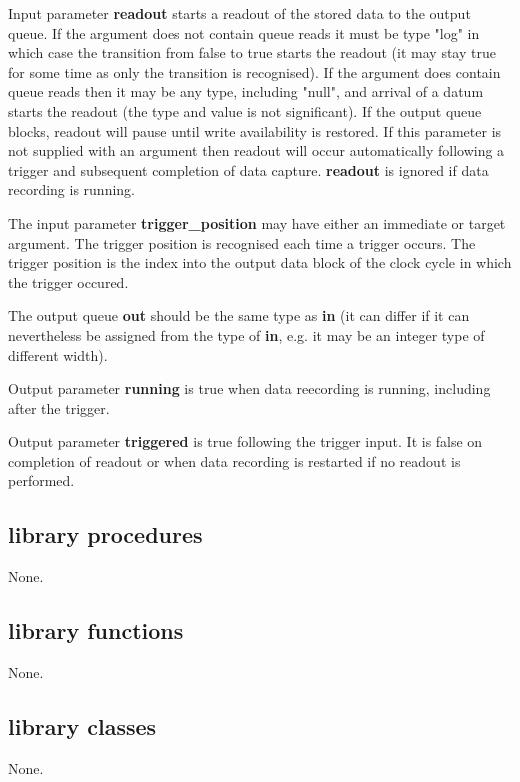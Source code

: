             Input parameter {\bf readout} starts a readout of the stored data to
            the output queue. If the argument does not contain queue reads it must
            be type "log" in which case the transition from false to true starts
            the readout (it may stay true for some time as only the transition
            is recognised). If the argument does contain queue reads then it may
            be any type, including "null", and arrival of a datum starts the
            readout (the type and value is not significant). If the output queue
            blocks, readout will pause until write availability is restored. If
            this parameter is not supplied with an argument then readout will
            occur automatically following a trigger and subsequent completion of
            data capture. {\bf readout} is ignored if data recording is running.

            The input parameter {\bf trigger\_position} may have either an
            immediate or target argument. The trigger position is recognised
            each time a trigger occurs. The trigger position is the index into
            the output data block of the clock cycle in which the trigger
            occured.

            The output queue {\bf out} should be the same type as {\bf in} (it
            can differ if it can nevertheless be assigned from the type of {\bf
            in}, e.g. it may be an integer type of different width).

            Output parameter {\bf running} is true when data reecording is
            running, including after the trigger.

            Output parameter {\bf triggered} is true following the trigger
            input. It is false on completion of readout or when data recording
            is restarted if no readout is performed.
 
 
 


    \subsection{library procedures}
    
        None.




    \subsection{library functions}
    
        None.


    \subsection{library classes}
    
        None.
